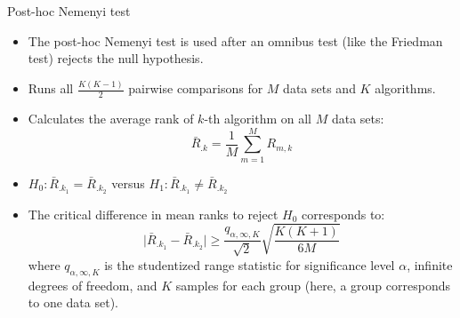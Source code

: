 \documentclass[11pt,compress,t,notes=noshow, aspectratio=169, xcolor=table]{beamer}
\begin{document}
\begin{frame}{Post-hoc Nemenyi test}

\begin{itemize}
\setlength\itemsep{1em}
\item The post-hoc Nemenyi test is used after an omnibus test (like the Friedman test) rejects the null hypothesis.
\item Runs all $\frac{K(K-1)}{2}$ pairwise comparisons for $M$ data sets and $K$ algorithms.
\item Calculates the average rank of $k$-th algorithm on all $M$ data sets: 
$$
\bar{R}_{.k} =\frac{1}{M} \sum_{m=1}^M R_{m, k}
$$
\item $H_0: \bar{R}_{.k_1} = \bar{R}_{.k_2}$ versus 
$H_1: \bar{R}_{.k_1} \neq \bar{R}_{.k_2}$
\item The critical difference in mean ranks to reject $H_0$ corresponds to:
$$ 
\vert \bar{R}_{.k_1} - \bar{R}_{.k_2} \vert \geq \frac{q_{\alpha, \infty, K}}{\sqrt{2}} \sqrt{\frac{K(K + 1)}{6M}}
$$
where $q_{\alpha, \infty, K}$ is the studentized range statistic for significance level $\alpha$, infinite degrees of freedom, and $K$ samples for each group (here, a group corresponds to one data set).
\end{itemize}
\end{frame}
\end{document}
